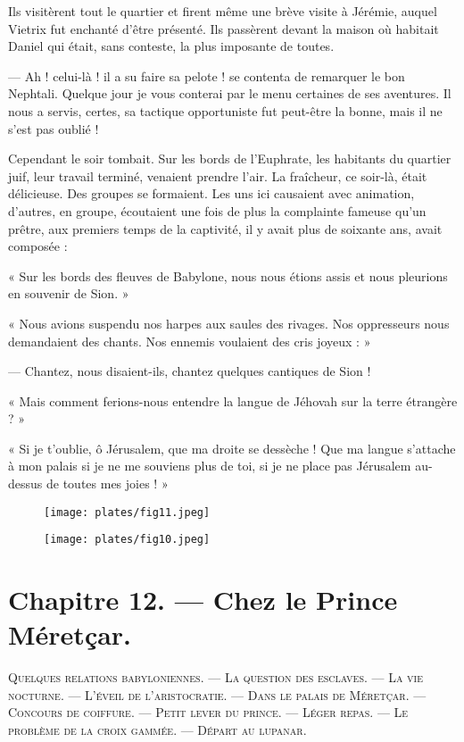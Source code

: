 \documentclass[a4paper, 11pt, oneside, polutonikogreek, french]{article}
\begin{document}
Ils visitèrent tout le quartier et firent même une brève visite à Jérémie, auquel Vietrix fut enchanté d'être présenté. Ils passèrent devant la maison où habitait Daniel qui était, sans conteste, la plus imposante de toutes.

--- Ah ! celui-là ! il a su faire sa pelote ! se contenta de remarquer le bon Nephtali. Quelque jour je vous conterai par le menu certaines de ses aventures. Il nous a servis, certes, sa tactique opportuniste fut peut-être la bonne, mais il ne s'est pas oublié !

Cependant le soir tombait. Sur les bords de l'Euphrate, les habitants du quartier juif, leur travail terminé, venaient prendre l'air. La fraîcheur, ce soir-là, était délicieuse. Des groupes se formaient. Les uns ici causaient avec animation, d'autres, en groupe, écoutaient une fois de plus la complainte fameuse qu'un prêtre, aux premiers temps de la captivité, il y avait plus de soixante ans, avait composée :

« Sur les bords des fleuves de Babylone, nous nous étions assis et nous pleurions en souvenir de Sion. »

« Nous avions suspendu nos harpes aux saules des rivages. Nos oppresseurs nous demandaient des chants. Nos ennemis voulaient des cris joyeux : »

--- Chantez, nous disaient-ils, chantez quelques cantiques de Sion !

« Mais comment ferions-nous entendre la langue de Jéhovah sur la terre étrangère ? »

« Si je t'oublie, ô Jérusalem, que ma droite se dessèche ! Que ma langue s'attache à mon palais si je ne me souviens plus de toi, si je ne place pas Jérusalem au-dessus de toutes mes joies ! »

\begin{figure}[H]
\centering
\texttt{[image: plates/fig11.jpeg]}
\end{figure}
\clearpage
\begin{figure}[H]
\centering
\texttt{[image: plates/fig10.jpeg]}
\end{figure}
\section{Chapitre 12. --- Chez le Prince Méretçar.}
\begin{center}
\scshape
\small
Quelques relations babyloniennes. --- La question des esclaves. --- La vie nocturne. --- L'éveil de l'aristocratie. --- Dans le palais de Méretçar. --- Concours de coiffure. --- Petit lever du prince. --- Léger repas. --- Le problème de la croix gammée. --- Départ au lupanar.
\end{center}
\end{document}
